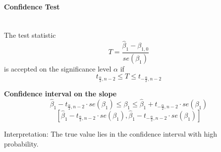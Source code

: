 \paragraph{Confidence Test}\mbox{}\\
The test statistic
\begin{equation}
  T = \frac{\hat{\beta}_1 - \beta_{1,0}}{se(\beta_1)}
\end{equation}
is accepted on the significance level $\alpha$ if
\begin{equation}
  t_{\frac{\alpha}{2}, n-2} \leq T \leq t_{-\frac{\alpha}{2}, n-2}
\end{equation}



\textbf{Confidence interval on the slope}
\begin{equation}
  \hat{\beta}_1 - t_{\frac{\alpha}{2}, n-2} \cdot se(\beta_1) \leq \beta_1 \leq  \hat{\beta}_1 + t_{-\frac{\alpha}{2}, n-2} \cdot se(\beta_1)
\end{equation}
\begin{equation}
  \left[\hat{\beta}_1 - t_{\frac{\alpha}{2}, n-2} \cdot se(\beta_1), \hat{\beta}_1 - t_{-\frac{\alpha}{2}, n-2} \cdot se(\beta_1)\right]
\end{equation}

Interpretation:
The true value lies in the confidence interval with high probability.
